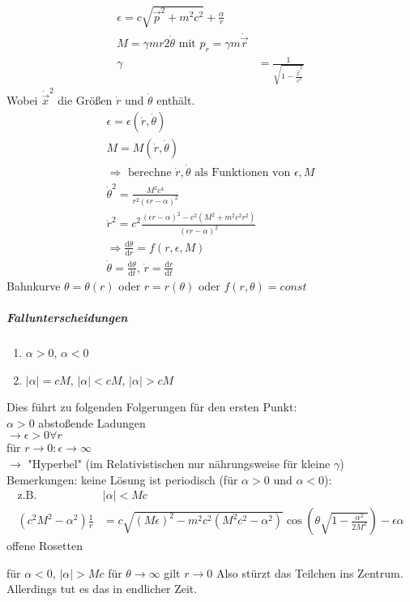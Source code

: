 \documentclass[a4paper]{article}
\begin{document}
\begin{align}
\epsilon=c\sqrt{\vec{p}^2+m^2c^2}+\frac{\alpha}{r}\\
M=\gamma mr2\dot{\theta} \text{ mit }p_r=\gamma m \dot{\vec{r}}\\
\gamma&=\frac{1}{\sqrt{1-\frac{\dot{\vec{x}}^2}{c^2}}}
\end{align}
Wobei $\dot{\vec{x}}^2$ die Größen $\dot{r}$ und $\dot{\theta}$ enthält.
\begin{align}
\epsilon=\epsilon(\dot{r},\dot{\theta})\\
M=M(\dot{r},\dot{\theta})\\
\Rightarrow \text{ berechne }\dot{r},\dot{\theta} \text{ als Funktionen von }
\epsilon,M\\
\dot{\theta}^2=\frac{M^2c^4}{r^2(\epsilon r -\alpha)^2}\\
\dot{r}^2=c^2\frac{(\epsilon r -\alpha)^2-c^2(M^2+m^2c^2r^2)}{(\epsilon r
-\alpha)^2}\\
\Rightarrow \frac{\mathrm{d}\theta}{\mathrm{d}r}=f(r,\epsilon,M)\\
\dot{\theta}=\frac{\mathrm{d}\theta}{\mathrm{d}t}\text{,  }\dot{r}=\frac{\mathrm{d}r}{\mathrm{d}t}
\end{align}
Bahnkurve $\theta=\theta(r)$ oder $r=r(\theta)$ oder
$f(r,\theta)=const$\\
\subparagraph{Fallunterscheidungen}
\begin{enumerate}
  \item $\alpha>0$, $\alpha<0$
  \item $|\alpha|=cM$, $|\alpha|<cM$, $|\alpha|>cM$
\end{enumerate}
Dies führt zu folgenden Folgerungen für den ersten Punkt:\\
$\alpha>0$ abstoßende Ladungen\\
$\rightarrow \epsilon>0 \forall r$\\
für $r\rightarrow 0: \epsilon\rightarrow\infty$\\
$\rightarrow$ "Hyperbel" (im Relativistischen nur nährungsweise für kleine
$\gamma$)
Bemerkungen:
keine Lösung ist periodisch (für $\alpha>0$ und $\alpha<0$):
\begin{align}
\text{z.B. } &|\alpha|<Mc\\
(c^2M^2-\alpha^2)\frac{1}{r}&=c\sqrt{(M\epsilon)^2-m^2c^2(M^2c^2-\alpha^2)}
\cos\left(\theta\sqrt{1-\frac{\alpha^2}{2M^2}}\right)-\epsilon\alpha
\end{align}
offene Rosetten

für $\alpha<0$, $|\alpha|>Mc$
für $\theta\rightarrow\infty$ gilt $r\rightarrow0$
Also stürzt das Teilchen ins Zentrum. Allerdings tut es das in endlicher Zeit.
\end{document}
